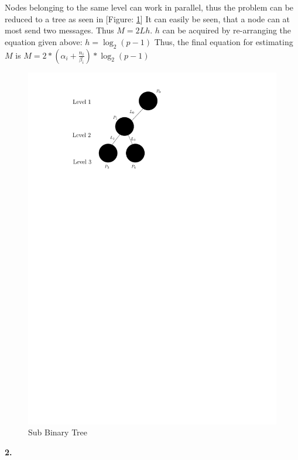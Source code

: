 \documentclass[a4paper,twoside,11pt]{article}
\begin{document}
Nodes belonging to the same level can work in parallel, thus the problem can be reduced to a tree as seen in [Figure: \ref{SubBinTree}]
It can easily be seen, that a node can at most send two messages. Thus $M = 2Lh$.
$h$ can be acquired by re-arranging the equation given above: $h=\log_2 (p-1)$
Thus, the final equation for estimating $M$ is $M= 2*(\alpha_i + \frac{n_i}{\beta_i}) * \log_2 (p-1)$


\begin{figure}[!htbp]
    \begin{center}
        \includegraphics[scale=1]{3c_2.pdf}
    \end{center}
    \caption{Sub Binary Tree}
    \label{SubBinTree}
\end{figure}

\textbf{2.}
\end{document}
